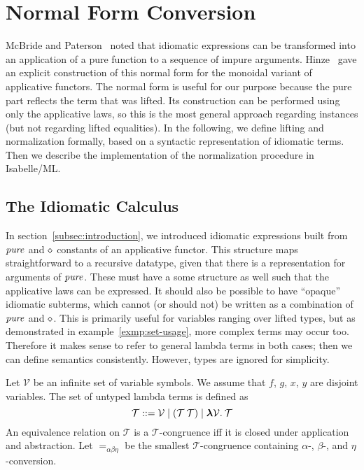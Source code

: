 \section{Normal Form Conversion}\label{sec:normal-form}

McBride and Paterson~\cite{mcbride08} noted that idiomatic expressions can
be transformed into an application of a pure function to a sequence of impure
arguments.
Hinze~\cite{hinze10} gave an explicit construction of this normal form for the
monoidal variant of applicative functors.
The normal form is useful for our purpose because the pure part reflects the
term that was lifted.
Its construction can be performed using only the applicative laws, so this is
the most general approach regarding instances (but not regarding lifted
equalities).
In the following, we define lifting and normalization formally, based on a
syntactic representation of idiomatic terms.
Then we describe the implementation of the normalization procedure in
Isabelle/ML.

\subsection{The Idiomatic Calculus}\label{subsec:idiomatic-calculus}

In section~\ref{subsec:introduction}, we introduced idiomatic expressions built
from $\operatorname{\mathit{pure}}$ and $\diamond$ constants of an applicative functor.
This structure maps straightforward to a recursive datatype, given that there
is a representation for arguments of $\operatorname{\mathit{pure}}$.
These must have a some structure as well such that the applicative laws can
be expressed.
It should also be possible to have ``opaque'' idiomatic subterms, which cannot
(or should not) be written as a combination of $\operatorname{\mathit{pure}}$ and $\diamond$.
This is primarily useful for variables ranging over lifted types, but as
demonstrated in example~\ref{exmp:set-usage}, more complex terms may occur too.
Therefore it makes sense to refer to general lambda terms in both cases;
then we can define semantics consistently.
However, types are ignored for simplicity.

\begin{definition}
Let $\mathcal{V}$ be an infinite set of variable symbols.
We assume that $f$, $g$, $x$, $y$ are disjoint variables.
The set of untyped lambda terms is defined as
\begin{equation}
	\mathcal{T} ::= \mathcal{V} \mid (\mathcal{T} \> \mathcal{T}) \mid
		{\boldsymbol\lambda} \mathcal{V}.\>\mathcal{T}
\end{equation}
An equivalence relation on $\mathcal{T}$ is a $\mathcal{T}$-congruence iff it
is closed under application and abstraction.
Let $=_{\alpha\beta\eta}$ be the smallest $\mathcal{T}$-congruence containing
$\alpha$-, $\beta$-, and $\eta$-conversion.
\end{definition}

